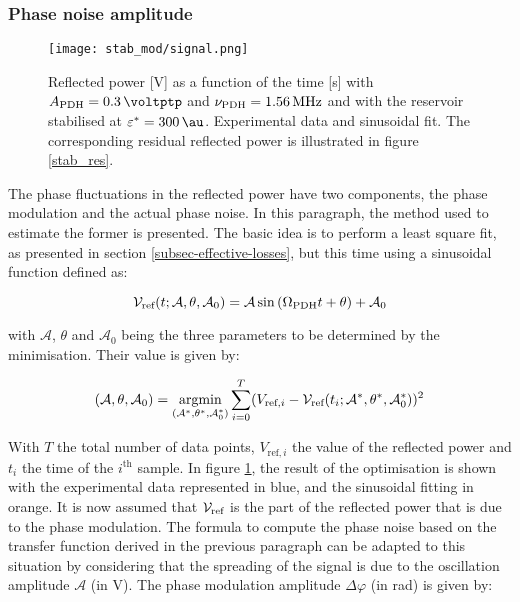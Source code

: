 
\subsubsection{Phase noise amplitude}

\begin{figure}
	\centering
	\texttt{[image: stab\_mod/signal.png]}
	\caption{Reflected power [\si{\volt}] as a function of the time [\si{\second}] with $\tind{A}{PDH} = \SI{0.3}{\voltptp}$ and $\nu_{\text{PDH}} = \SI{1.56}{\mega\hertz}$ and with the reservoir stabilised at $\epsilon^* = \SI{300}{\au}$. Experimental data and sinusoidal fit. The corresponding residual reflected power is illustrated in figure \ref{stab_res}.}
	\label{stab_mod_signal}
\end{figure}

The phase fluctuations in the reflected power have two components, the \pdh phase modulation and the actual phase noise. In this paragraph, the method used to estimate the former is presented. The basic idea is to perform a least square fit, as presented in section \ref{subsec-effective-losses}, but this time using a sinusoidal function defined as:

\begin{equation}
	\mathcal{V}_{\text{ref}}(t;\mathcal{A},\theta,\mathcal{A}_0) = \mathcal{A}\sin{(\Omega_{\text{PDH}}t+\theta)}+\mathcal{A}_0
\end{equation}

with $\mathcal{A}$, $\theta$ and $\mathcal{A}_0$ being the three parameters to be determined by the minimisation. Their value is given by:

\begin{equation}
	(\mathcal{A},\theta,\mathcal{A}_0) = \underset{(\mathcal{A}^*,\theta^*,\mathcal{A}_0^*)}{\text{argmin}} \sum_{i=0}^T (V_{\text{ref},i} - \mathcal{V}_{\text{ref}}(t_i;\mathcal{A}^*,\theta^*,\mathcal{A}_0^*))^2
\end{equation}

With $T$ the total number of data points, $V_{\text{ref},i}$ the value of the reflected power and $t_i$ the time of the $i^{\text{th}}$ sample. In figure \ref{stab_mod_signal}, the result of the optimisation is shown with the experimental data represented in blue, and the sinusoidal fitting in orange. It is now assumed that $\mathcal{V}_{\text{ref}}$ is the part of the reflected power that is due to the phase modulation. The formula to compute the phase noise based on the transfer function derived in the previous paragraph can be adapted to this situation by considering that the spreading of the signal is due to the oscillation amplitude $\mathcal{A}$ (in \si{\volt}). The phase modulation amplitude $\Delta \varphi$ (in \si{\radian}) is given by:

